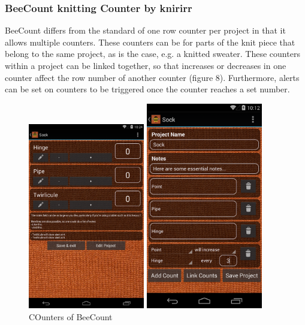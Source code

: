 \subsubsection*{BeeCount knitting Counter by knirirr}
BeeCount differs from the standard of one row counter per project in that it allows multiple counters. These counters can be for parts of the knit piece that  belong to the same project, as is the case, e.g. a knitted sweater. These counters within a project can be linked together, so that increases or decreases in one counter affect the row number of another counter (figure 8). Furthermore, alerts can be set on counters to be triggered once the counter
reaches a set number.

\begin{figure}[H]
\centering
\begin{minipage}{.5\textwidth}
  \centering
  \includegraphics[width=2in]{images/image01.png}
  \caption[Counters of BeeCount ]{COunters of BeeCount}
  \label{fig_beecount1}
\end{minipage}
\begin{minipage}{.5\textwidth}
  \centering
  \includegraphics[width=2in]{images/image07.png}

\end{minipage}
\end{figure}
